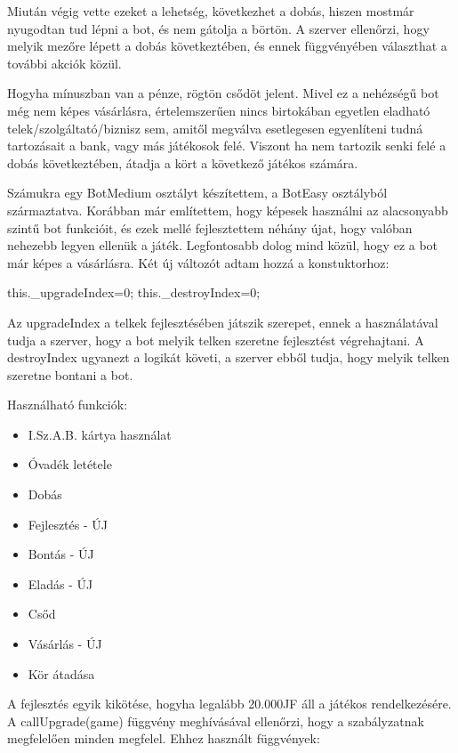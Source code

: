 Miután végig vette ezeket a lehetség, következhet a dobás, hiszen mostmár nyugodtan tud lépni a bot, és nem gátolja a börtön. A szerver ellenőrzi, hogy melyik mezőre lépett a dobás következtében, és ennek függvényében választhat a további akciók közül.

Hogyha mínuszban van a pénze, rögtön csődöt jelent. Mivel ez a nehézségű bot még nem képes vásárlásra, értelemszerűen nincs birtokában egyetlen eladható  telek/szolgáltató/biznisz sem, amitől megválva esetlegesen egyenlíteni tudná tartozásait a bank, vagy más játékosok felé. Viszont ha nem tartozik senki felé a dobás következtében, átadja a kört a következő játékos számára. 



Számukra egy BotMedium osztályt készítettem, a BotEasy osztályból származtatva. Korábban már említettem, hogy képesek használni az alacsonyabb szintű bot funkcióit, és ezek mellé fejlesztettem néhány újat, hogy valóban nehezebb legyen ellenük a játék. Legfontosabb dolog mind közül, hogy ez a bot már képes a vásárlásra. Két új változót adtam hozzá a konstuktorhoz:

\begin{javascript}
  this._upgradeIndex=0;
  this._destroyIndex=0;
\end{javascript}

Az upgradeIndex a telkek fejlesztésében játszik szerepet, ennek a használatával tudja a szerver, hogy a bot melyik telken szeretne fejlesztést végrehajtani. A destroyIndex ugyanezt a logikát követi, a szerver ebből tudja, hogy melyik telken szeretne bontani a bot.


Használható funkciók:

\begin{itemize}
\item I.Sz.A.B. kártya használat
\item Óvadék letétele
\item Dobás
\item Fejlesztés - ÚJ
\item Bontás - ÚJ
\item Eladás - ÚJ
\item Csőd
\item Vásárlás - ÚJ
\item Kör átadása
\end{itemize}

A fejlesztés egyik kikötése, hogyha legalább 20.000JF áll a játékos rendelkezésére. A callUpgrade(game) függvény meghívásával ellenőrzi, hogy a szabályzatnak megfelelően minden megfelel. Ehhez használt függvények:

